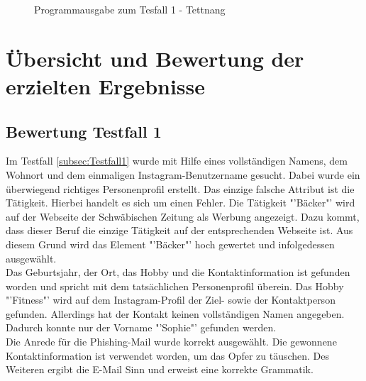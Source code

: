 			\begin{figure}[h!]
				\caption{Programmausgabe zum Tesfall 1 - Tettnang}
			\end{figure}
			\FloatBarrier
			
\section{Übersicht und Bewertung der erzielten Ergebnisse}
	\subsection{Bewertung Testfall 1}
	Im Testfall \ref{subsec:Testfall1} wurde mit Hilfe eines vollständigen Namens, dem Wohnort und dem einmaligen Instagram-Benutzername gesucht. Dabei wurde ein überwiegend richtiges Personenprofil erstellt. Das einzige falsche Attribut ist die Tätigkeit. Hierbei handelt es sich um einen Fehler. Die Tätigkeit "'Bäcker"' wird auf der Webseite der Schwäbischen Zeitung als Werbung angezeigt. Dazu kommt, dass dieser Beruf die einzige Tätigkeit auf der entsprechenden Webseite ist. Aus diesem Grund wird das Element "'Bäcker"' hoch gewertet und infolgedessen ausgewählt.\\
	Das Geburtsjahr, der Ort, das Hobby und die Kontaktinformation ist gefunden worden und spricht mit dem tatsächlichen Personenprofil überein. Das Hobby "'Fitness"' wird auf dem Instagram-Profil der Ziel- sowie der Kontaktperson gefunden. Allerdings hat der Kontakt keinen vollständigen Namen angegeben. Dadurch konnte nur der Vorname "'Sophie"' gefunden werden.\\
	Die Anrede für die Phishing-Mail wurde korrekt ausgewählt. Die gewonnene Kontaktinformation ist verwendet worden, um das Opfer zu täuschen. Des Weiteren ergibt die E-Mail Sinn und erweist eine korrekte Grammatik. 
